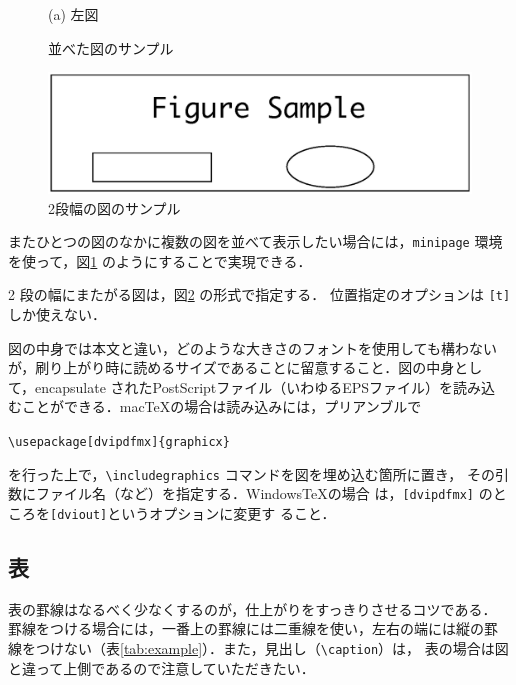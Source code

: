\documentclass[a4j]{matsushita-zemi}
\begin{document}
\begin{figure}[t]
\begin{minipage}{0.49\hsize}
\begin{center}
      \small{(a) 左図}
    \end{center}
  \end{minipage}
  \vspace{2pt}
  \caption{並べた図のサンプル}
  \label{fig:twoGraphs}
\end{figure}


\begin{figure}[tb]
  \centering\includegraphics[clip, width=.9\textwidth]{figureSample3.eps}
  \caption{2段幅の図のサンプル}
  \label{fig:double}
\end{figure}


またひとつの図のなかに複数の図を並べて表示したい場合には，\verb|minipage|
環境を使って，図\ref{fig:twoGraphs} のようにすることで実現できる．

2 段の幅にまたがる図は，図\ref{fig:double} の形式で指定する．
位置指定のオプションは \verb|[t]| しか使えない．

図の中身では本文と違い，どのような大きさのフォントを使用しても構わない
が，刷り上がり時に読めるサイズであることに留意すること．図の中身とし
て，encapsulate されたPostScriptファイル（いわゆるEPSファイル）を読み込
むことができる．mac\TeX の場合は読み込みには，プリアンブルで
%
\begin{framed}
    \verb|\usepackage[dvipdfmx]{graphicx}|
\end{framed}
%

\noindent
を行った上で，\verb|\includegraphics| コマンドを図を埋め込む箇所に置き，
その引数にファイル名（など）を指定する．Windows\TeX の場合
は，\verb|[dvipdfmx]| のところを\verb|[dviout]|というオプションに変更す
ること．

\subsection{表}

表の罫線はなるべく少なくするのが，仕上がりをすっきりさせるコツである．
罫線をつける場合には，一番上の罫線には二重線を使い，左右の端には縦の罫
線をつけない（表\ref{tab:example}）．また，見出し（\verb|\caption|）は，
表の場合は図と違って上側であるので注意していただきたい．
\end{document}
